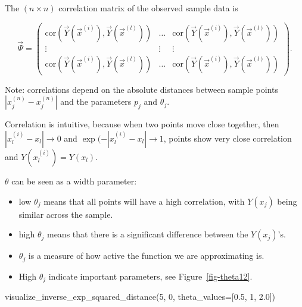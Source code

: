 \documentclass[
  letterpaper,
  DIV=11,
  numbers=noendperiod]{scrreprt}
\newenvironment{Shaded}{\begin{snugshade}}{\end{snugshade}}
\newcommand{\DecValTok}[1]{\textcolor[rgb]{0.68,0.00,0.00}{#1}}
\newcommand{\FloatTok}[1]{\textcolor[rgb]{0.68,0.00,0.00}{#1}}
\newcommand{\NormalTok}[1]{\textcolor[rgb]{0.00,0.23,0.31}{#1}}
\newcommand{\OperatorTok}[1]{\textcolor[rgb]{0.37,0.37,0.37}{#1}}
\providecommand{\tightlist}{%
  \setlength{\itemsep}{0pt}\setlength{\parskip}{0pt}}\usepackage{longtable,booktabs,array}
\begin{document}
The \((n \times n)\) correlation matrix of the observed sample data is

\[
\vec{\Psi} = \begin{pmatrix}
\text{cor}\left(
\vec{Y}(\vec{x}^{(i)}),
\vec{Y}(\vec{x}^{(l)}) 
\right) & \ldots &
\text{cor}\left(
\vec{Y}(\vec{x}^{(i)}),
\vec{Y}(\vec{x}^{(l)}) 
\right)\\
\vdots  & \vdots &  \vdots\\
 \text{cor}\left(
\vec{Y}(\vec{x}^{(i)}),
\vec{Y}(\vec{x}^{(l)}) 
\right)&
\ldots &
\text{cor}\left(
\vec{Y}(\vec{x}^{(i)}),
\vec{Y}(\vec{x}^{(l)}) 
\right)
\end{pmatrix}.
\]

Note: correlations depend on the absolute distances between sample
points \(|x_j^{(n)} - x_j^{(n)}|\) and the parameters \(p_j\) and
\(\theta_j\).

Correlation is intuitive, because when two points move close together,
then \(|x_l^{(i)} - x_l| \to 0\) and \(\exp(-|x_l^{(i)} - x_l| \to 1\),
points show very close correlation and \(Y(x_l^{(i)}) = Y(x_l)\).

\(\theta\) can be seen as a width parameter:

\begin{itemize}
\tightlist
\item
  low \(\theta_j\) means that all points will have a high correlation,
  with \(Y(x_j)\) being similar across the sample.
\item
  high \(\theta_j\) means that there is a significant difference between
  the \(Y(x_j)\)'s.
\item
  \(\theta_j\) is a measure of how active the function we are
  approximating is.
\item
  High \(\theta_j\) indicate important parameters, see
  Figure~\ref{fig-theta12}.
\end{itemize}

\begin{Shaded}
\begin{Highlighting}[]
\NormalTok{visualize\_inverse\_exp\_squared\_distance(}\DecValTok{5}\NormalTok{, }\DecValTok{0}\NormalTok{, theta\_values}\OperatorTok{=}\NormalTok{[}\FloatTok{0.5}\NormalTok{, }\DecValTok{1}\NormalTok{, }\FloatTok{2.0}\NormalTok{])}
\end{Highlighting}
\end{Shaded}
\end{document}
